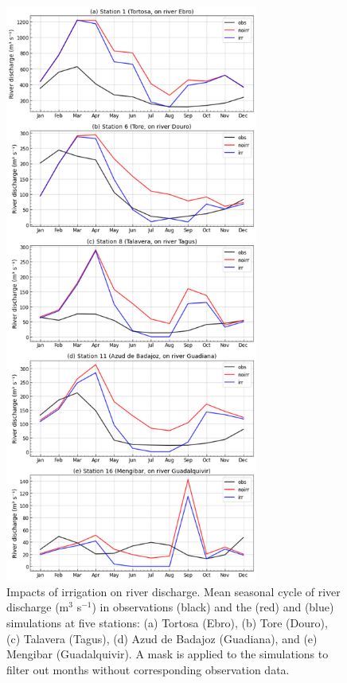 \begin{figure}[htbp]
    \centering
    \includegraphics[width=8.3cm]{images/chap4/article/f05.png} 
    \caption{Impacts of irrigation on river discharge. Mean seasonal cycle of river discharge (m$^3$ s$^{-1}$) in observations (black) and the \noirr (red) and \irr (blue) simulations at five stations: (a) Tortosa (Ebro), (b) Tore (Douro), (c) Talavera (Tagus), (d) Azud de Badajoz (Guadiana), and (e) Mengibar (Guadalquivir). A mask is applied to the simulations to filter out months without corresponding observation data.}
    \label{fig:discharge_SC}
\end{figure}

